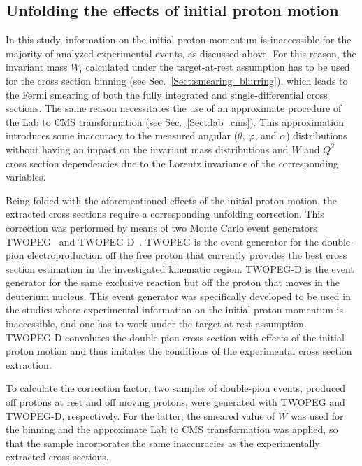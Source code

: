 \documentclass[prc,twocolumn,superscriptaddress,showpacs,amssymb,amsmath,amsfonts,aps,nofootinbib]{revtex4-1}
\begin{document}
\subsection{Unfolding the effects of initial proton motion}
\label{Sect:fermi_corr}


In this study, information on the initial proton momentum is inaccessible for the majority of analyzed experimental events, as discussed above. For this reason, the invariant mass $W_{\textrm{i}}$ calculated under the target-at-rest assumption has to be used for the cross section binning (see Sec.\!~\ref{Sect:smearing_blurring}), which leads to the Fermi smearing of both the fully integrated and single-differential cross sections. The same reason necessitates the use of an approximate procedure of the Lab to CMS transformation (see Sec.\!~\ref{Sect:lab_cms}). This approximation introduces some inaccuracy to the measured angular ($\theta$, $\varphi$, and $\alpha$) distributions without having an impact on the invariant mass distributions and $W$ and $Q^{2}$ cross section dependencies due to the Lorentz invariance of the corresponding variables. 


Being folded with the aforementioned effects of the initial proton motion, the extracted cross sections require a corresponding unfolding correction. This correction was performed by means of two Monte Carlo event generators TWOPEG~\cite{twopeg} and TWOPEG-D~\cite{twopeg-d}. TWOPEG is the event generator for the double-pion electroproduction off the free proton that currently provides the best cross section estimation in the investigated kinematic region. TWOPEG-D is the event generator for the same exclusive reaction but off the proton that moves in the deuterium nucleus. This event generator was specifically developed to be used in the studies where experimental information on the initial proton momentum is inaccessible, and one has to work under the target-at-rest assumption. TWOPEG-D convolutes the double-pion cross section with effects of the initial proton motion and thus imitates the conditions of the experimental cross section extraction.

To calculate the correction factor, two samples of double-pion events, produced off protons at rest and off moving protons, were generated with TWOPEG and TWOPEG-D, respectively. For the latter, the smeared value of $W$ was used for the binning and the approximate Lab to CMS transformation was applied, so that the sample incorporates the same inaccuracies as the experimentally extracted cross sections.
\end{document}
